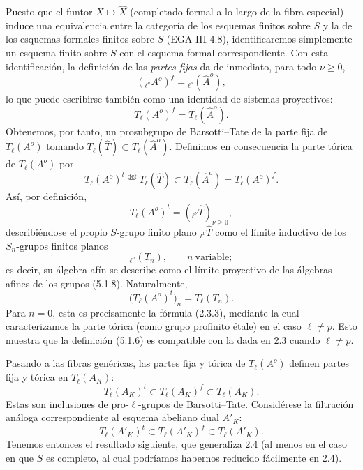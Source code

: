 Puesto que el funtor $X\longmapsto\widehat X$ (completado formal a lo
largo de la fibra especial) induce una equivalencia entre la categoría
de los esquemas finitos sobre $S$ y la de los esquemas formales finitos
sobre $S$ (EGA III 4.8), identificaremos simplemente un esquema finito
sobre $S$ con el esquema formal correspondiente. Con esta
identificación, la definición de las \emph{partes fijas} da de inmediato,
para todo $\nu\geq0$,
\begin{equation}\tag{5.1.4}
 ({}_{\ell^\nu}A^o)^f={}_{\ell^\nu}(\widehat A^o),
\end{equation}
lo que puede escribirse también como una identidad de sistemas
proyectivos:
\begin{equation}\tag{5.1.5}
 T_\ell(A^o)^f=T_\ell(\widehat A^o).
\end{equation}
Obtenemos, por tanto, un prosubgrupo de Barsotti--Tate de la parte fija
de $T_\ell(A^o)$ tomando
$T_\ell(\widehat T)\subset T_\ell(\widehat A^o)$. Definimos en
consecuencia la \underline{parte tórica} de $T_\ell(A^o)$ por
\begin{equation}\tag{5.1.6}
 T_\ell(A^o)^t
 \stackrel{\mathrm{def}}{=}
 T_\ell(\widehat T)
 \subset T_\ell(\widehat A^o)
 =T_\ell(A^o)^f.
\end{equation}
Así, por definición,
\begin{equation}\tag{5.1.7}
 T_\ell(A^o)^t=({}_{\ell^\nu}\widehat T)_{\nu\geq0},
\end{equation}
describiéndose el propio $S$-grupo finito plano
${}_{\ell^\nu}\widehat T$ como el límite inductivo de los $S_n$-grupos
finitos planos
\begin{equation}\tag{5.1.8}
 {}_{\ell^\nu}(T_n),\qquad n\ \text{variable};
\end{equation}
es decir, su álgebra afín se describe como el límite proyectivo de las
álgebras afines de los grupos (5.1.8). Naturalmente,
\begin{equation}\tag{5.1.9}
 \bigl(T_\ell(A^o)^t\bigr)_n=T_\ell(T_n).
\end{equation}
Para $n=0$, esta es precisamente la fórmula (2.3.3), mediante la cual
caracterizamos la parte tórica (como grupo profinito étale) en el caso
$\ell\neq p$. Esto muestra que la definición (5.1.6) es compatible con
la dada en 2.3 cuando $\ell\neq p$.

Pasando a las fibras genéricas, las partes fija y tórica de
$T_\ell(A^o)$ definen partes fija y tórica en $T_\ell(A_K)$:
\begin{equation}\tag{5.1.10}
 T_\ell(A_K)^t\subset T_\ell(A_K)^f\subset T_\ell(A_K).
\end{equation}
Estas son inclusiones de pro-$\ell$-grupos de Barsotti--Tate.
Considérese la filtración análoga correspondiente al esquema abeliano
dual $A'_K$:
\begin{equation}\tag{5.1.11}
 T_\ell(A'_K)^t\subset T_\ell(A'_K)^f\subset T_\ell(A'_K).
\end{equation}
Tenemos entonces el resultado siguiente, que generaliza 2.4 (al menos
en el caso en que $S$ es completo, al cual podríamos habernos reducido
fácilmente en 2.4).
